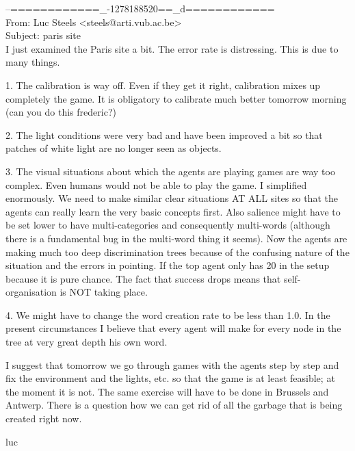 \begin{mail}
--============\_-1278188520==\_d============\\
From: Luc Steels <steels@arti.vub.ac.be>\\
Subject: paris site \\

I just examined the Paris site a bit. The error rate is
distressing. This is due to many things.

1. The calibration is way off. Even if they get it
right, calibration mixes up completely the game.
It is obligatory to calibrate much better tomorrow
morning (can you do this frederic?)

2. The light conditions were very bad and have been improved a bit so that 
patches of white light are no longer seen as objects.

3. The visual situations about which the agents are playing games
are way too complex. Even humans would not be able to play the game. I simplified
enormously. We need to make similar clear situations AT ALL sites so that the 
agents can really learn the very basic concepts first. Also salience
might have to be set lower to have multi-categories and consequently multi-words
(although there is a fundamental bug in the multi-word thing it seems). Now the
agents are making much too deep discrimination trees because of the confusing 
nature of the situation and the errors in pointing. If the top agent 
only has 20 %
in the setup because it is pure chance. The fact that success drops means 
that self-organisation is NOT taking place.

4. We might have to change the word creation rate to be less than 1.0. 
In the present circumstances I believe that every agent will make for every node
in the tree at very great depth his own word.

I suggest that tomorrow we go through games with the agents step by step and fix 
the environment and the lights, etc. so that the game is at least feasible; at the 
moment it is not. The same exercise will have to be done in Brussels and Antwerp. 
There is a question how we can get rid of all the garbage that is being created right now.

luc
\end{mail}

